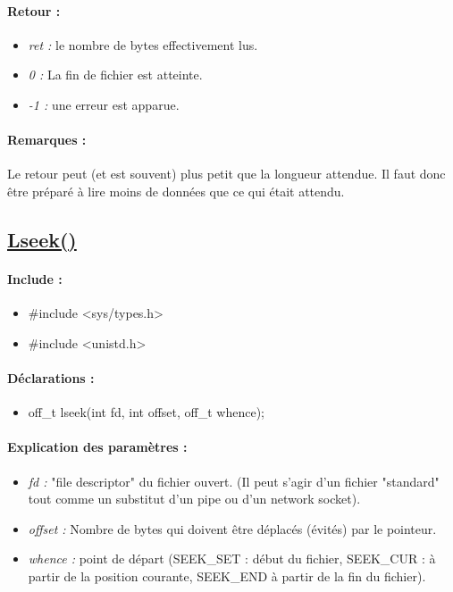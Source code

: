 \documentclass{article}[12pt]
\begin{document}
\paragraph{Retour : }
\begin{itemize}
	\item \emph{ret : } le nombre de bytes effectivement lus.
	\item \emph{0 : } La fin de fichier est atteinte.
	\item \emph{-1 : } une erreur est apparue.
\end{itemize}
\paragraph{Remarques : }
Le retour peut (et est souvent) plus petit que la longueur attendue. Il faut donc être préparé à lire moins de données que ce qui était attendu. 
\subsection{\href{http://jp.barralis.com/linux-man/man2/lseek.2.php}{Lseek()}}
\paragraph{Include : }
\begin{itemize}
	\item \#include <sys/types.h>
	\item \#include <unistd.h>
\end{itemize}
\paragraph{Déclarations : }
\begin{itemize}
	\item off\_t lseek(int fd, int offset, off\_t whence);
\end{itemize}
\paragraph{Explication des paramètres : }
\begin{itemize}
	\item \emph{fd : } "file descriptor" du fichier ouvert. (Il peut s'agir d'un fichier "standard" tout comme un substitut d'un pipe ou d'un network socket).
	\item \emph{offset : } Nombre de bytes qui doivent être déplacés (évités) par le pointeur.
	\item \emph{whence : } point de départ (SEEK\_SET : début du fichier, SEEK\_CUR : à partir de la position courante, SEEK\_END à partir de la fin du fichier).
\end{itemize}
\end{document}
